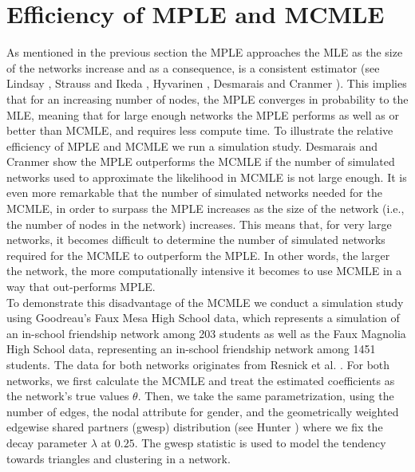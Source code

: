 \documentclass[10pt, conference, compsocconf]{IEEEtran}
\begin{document}
\section{Efficiency of MPLE and MCMLE}
As mentioned in the previous section the MPLE approaches the MLE as the size of the networks increase and as a consequence, is a consistent estimator (see Lindsay \cite{Lindsay1988}, Strauss and Ikeda \cite{StraussIkeda1990}, Hyvarinen \cite{Hyvarinen2006}, Desmarais and Cranmer \cite{Desmarais.2012,desmarais2010consistent}). This implies that for an increasing number of nodes, the MPLE converges in probability to the MLE, meaning that for large enough networks the MPLE performs as well as or better than MCMLE, and requires less compute time. To illustrate the relative efficiency of MPLE and MCMLE we run a simulation study. Desmarais and Cranmer \cite{Desmarais.2012} show the MPLE outperforms the MCMLE if the number of simulated networks used to approximate the likelihood in MCMLE is not large enough. It is even more remarkable that the number of simulated networks needed for the MCMLE, in order to surpass the MPLE increases as the size of the network (i.e., the number of nodes in the network) increases. This means that, for very large networks, it becomes difficult to determine the number of simulated networks required for the MCMLE to outperform the MPLE. In other words, the larger the network, the more computationally intensive it becomes to use MCMLE in a way that out-performs MPLE.\\
\indent To demonstrate this disadvantage of the MCMLE we conduct a simulation study using Goodreau's \cite{HunterDavidR..2008} Faux Mesa High School data, which represents a simulation of an in-school friendship network among 203 students as well as the Faux Magnolia High School data, representing an in-school friendship network among 1451 students. The data for both networks originates from Resnick et al. \cite{Resnicketal1997}. For both networks, we first calculate the MCMLE and treat the estimated coefficients as the network's true values $\theta$. Then, we take the same parametrization, using the number of edges, the nodal attribute for gender, and the geometrically weighted edgewise shared partners (gwesp) distribution (see Hunter \cite{Hunter.2006}) where we fix the decay parameter $\lambda$ at $0.25$. The gwesp statistic is used to model the tendency towards triangles and clustering in a network.
\end{document}
